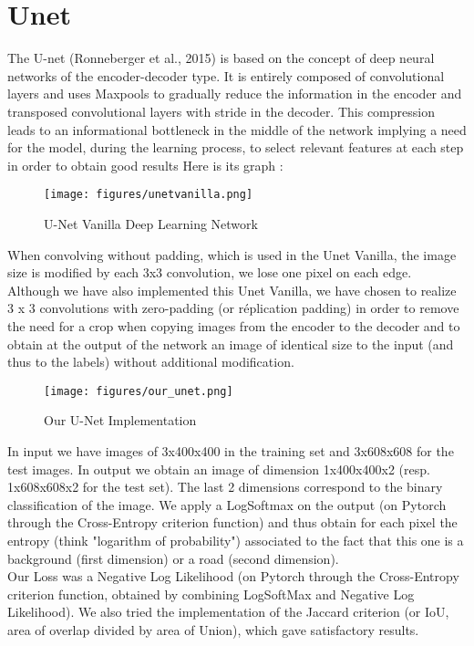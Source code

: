 \documentclass[10pt,conference,compsocconf]{IEEEtran}
\begin{document}
\section{Unet}
The U-net (Ronneberger et al., 2015) is based on the concept of deep neural networks of the encoder-decoder type.
It is entirely composed of convolutional layers and uses Maxpools to gradually reduce the information in the encoder and transposed convolutional layers with stride in the decoder.
This compression leads to an informational bottleneck in the middle of the network implying a need for the model, during the learning process, to select relevant features at each step in order to obtain good results
Here is its graph :
\FloatBarrier
\begin{figure}[ht] \centering
    \texttt{[image: figures/unetvanilla.png]}
    \caption{U-Net Vanilla Deep Learning Network}
    \label{fig:unetvanilla}
\end{figure}
\FloatBarrier
When convolving without padding, which is used in the Unet Vanilla, the image size is modified by each 3x3 convolution, we lose one pixel on each edge. Although we have also implemented this Unet Vanilla, we have chosen to realize 3 x 3 convolutions with zero-padding (or réplication padding) in order to remove the need for a crop when copying images from the encoder to the decoder and to obtain at the output of the network an image of identical size to the input (and thus to the labels) without additional modification.
\FloatBarrier
\begin{figure}[ht] \centering
    \texttt{[image: figures/our\_unet.png]}
    \caption{Our U-Net Implementation}
    \label{fig:unet}
\end{figure}
\FloatBarrier
In input we have images of 3x400x400 in the training set and 3x608x608 for the test images. In output we obtain an image of dimension 1x400x400x2 (resp. 1x608x608x2 for the test set). The last 2 dimensions correspond to the binary classification of the image. We apply a LogSoftmax on the output (on Pytorch through the Cross-Entropy criterion function) and thus obtain for each pixel the entropy (think "logarithm of probability") associated to the fact that this one is a background (first dimension) or a road (second dimension). \\
Our Loss was a Negative Log Likelihood (on Pytorch through the Cross-Entropy criterion function, obtained by combining LogSoftMax and Negative Log Likelihood). We also tried the implementation of the Jaccard criterion (or IoU, area of overlap divided by area of Union), which gave satisfactory results. \\
\end{document}
